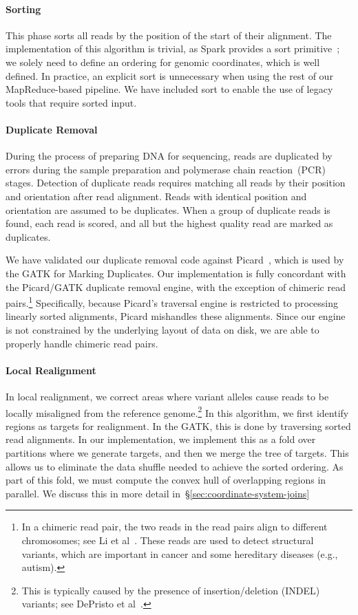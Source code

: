 \documentclass{acm_proc_article-sp}
\begin{document}
\paragraph{Sorting}
\label{sec:sorting}
This phase sorts all reads by the position of the start of their alignment. The implementation of this
algorithm is trivial, as Spark provides a sort primitive~\cite{zaharia10}; we solely need to define an
ordering for genomic coordinates, which is well defined. In practice, an explicit sort is unnecessary when
using the rest of our MapReduce-based pipeline. We have included sort to enable the use of legacy
tools that require sorted input.

\paragraph{Duplicate Removal} 
\label{sec:duplicate-removal}
During the process of preparing DNA for sequencing, reads are duplicated by errors during the sample
preparation and polymerase chain reaction~(PCR) stages. Detection of duplicate reads requires
matching all reads by their position and orientation after read alignment. Reads with identical position
and orientation are assumed to be duplicates. When a group of duplicate reads is found, each read is
scored, and all but the highest quality read are marked as duplicates.

We have validated our duplicate removal code against Picard~\cite{picard}, which is used by the GATK
for Marking Duplicates. Our implementation is fully concordant with the Picard/GATK duplicate removal
engine, with the exception of chimeric read pairs.\footnote{In a chimeric read pair, the two reads in the
read pairs align to different chromosomes; see Li et al~\cite{li10}. These reads are used to detect
structural variants, which are important in cancer and some hereditary diseases (e.g., autism).}
Specifically, because Picard's traversal engine is restricted to processing linearly sorted alignments,
Picard mishandles these alignments. Since our engine is not constrained by the underlying layout of data
on disk, we are able to properly handle chimeric read pairs.

\paragraph{Local Realignment} 
\label{sec:local-realignment}

In local realignment, we correct areas where variant alleles cause reads to be locally misaligned from the
reference genome.\footnote{This is typically caused by the presence of insertion/deletion (INDEL)
variants; see DePristo et al~\cite{depristo11}.} In this algorithm, we first identify regions as targets for
realignment. In the GATK, this is done by traversing sorted read alignments. In our implementation, we
implement this as a fold over partitions where we generate targets, and then we merge the tree of
targets. This allows us to eliminate the data shuffle needed to achieve the sorted ordering. As part of this
fold, we must compute the convex hull of overlapping regions in parallel. We discuss this in more detail
in~\S\ref{sec:coordinate-system-joins}
\end{document}
